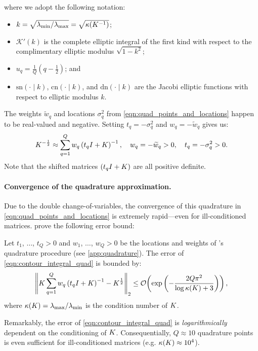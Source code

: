 %
where we adopt the following notation:
\begin{itemize}
  \item $k = \sqrt{ \lambda_\text{min} / \lambda_\text{max} } = \sqrt{ \kappa(K^{-1}) }$;
  \item $\mathcal{K}'(k)$ is the complete elliptic integral of the first kind with respect to the complimentary elliptic modulus $\sqrt{1 - k^2}$;
  \item $u_q = \frac{1}{Q}(q - \frac 1 2)$; and
  \item $\text{sn}(\cdot \mid k)$, $\text{cn}(\cdot \mid k )$, and $\text{dn}(\cdot \mid k)$ are the Jacobi elliptic functions with respect to elliptic modulus $k$.
\end{itemize}
%
The weights $\widetilde w_q$ and locations $\sigma_q^2$ from \cref{eqn:quad_points_and_locations} happen to be real-valued and negative.
Setting $t_q = -\sigma_q^2$ and $w_q = -\widetilde w_q$ gives us:
%
\begin{equation}
	K^{-\frac 1 2} \approx \sum_{q=1}^Q w_q \left( t_q I + K \right)^{-1}, \quad w_q = -\widetilde w_q > 0, \quad t_q = -\sigma_q^2 > 0.
  \label{eqn:contour_integral_quad_4}
\end{equation}
%
Note that the shifted matrices $(t_q I + K)$ are all positive definite.

\paragraph{Convergence of the quadrature approximation.}
Due to the double change-of-variables, the convergence of this quadrature in \cref{eqn:quad_points_and_locations} is extremely rapid---even for ill-conditioned matrices.
\citeauthor{hale2008computing} prove the following error bound:
%
\begin{lemma}
  Let $t_1$, $\ldots$, $t_Q > 0$ and $w_1$, $\ldots$, $w_Q > 0$ be the locations and weights of \citeauthor{hale2008computing}'s quadrature procedure (see \cref{app:quadrature}).
  The error of \cref{eqn:contour_integral_quad} is bounded by:
  \[
    \left\Vert \bK \sum_{q=1}^Q w_q \left( t_q \bI + \bK \right)^{-1} - \bK^{\frac 1 2} \right\Vert_2
    \leq \bigo{\exp\left( -\frac  {2 Q \pi^2}{\log \kappa(\bK) + 3} \right)},
  \]
  where $\kappa(K) = \lambda_\text{max} / \lambda_\text{min}$ is the condition number of $K$.
\label{lemma:hale}
\end{lemma}
%
\noindent
Remarkably, the error of \cref{eqn:contour_integral_quad} is \emph{logarithmically} dependent on the conditioning of $K$.
Consequentially, $Q\approx10$ quadrature points is even sufficient for ill-conditioned matrices (e.g. $\kappa(K) \approx 10^4$).

